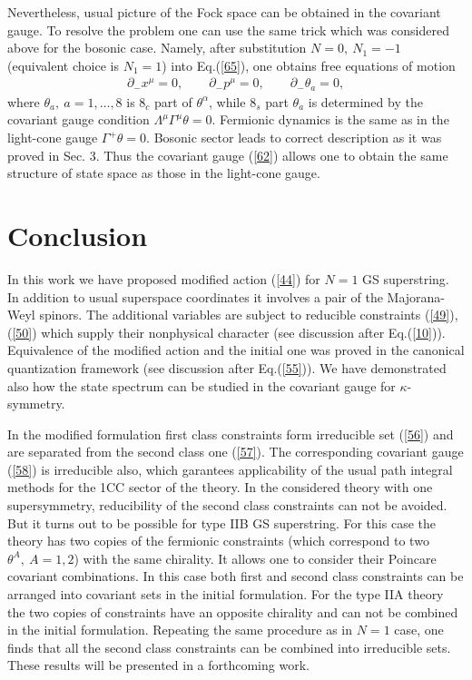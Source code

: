 \documentclass[a4paper]{article}
\begin{document}
Nevertheless, usual picture of the Fock space can be obtained in the 
covariant gauge. To resolve the problem one can use the same trick which 
was considered above for the bosonic case. Namely, after substitution 
$N=0, ~ N_1=-1$ (equivalent choice is $N_1=1$) into Eq.(\ref{65}), one 
obtains free equations of motion
\begin{eqnarray}\label{66}
\partial_-x^\mu=0, \qquad \partial_-p^\mu=0, \qquad
\partial_-\theta_a=0, 
\end{eqnarray}
where $\theta_a, ~ a=1, \ldots ,8$ is $8_c$ part of $\theta^\alpha$, 
while $8_s$ part $\theta_{\dot a}$ is determined by the covariant gauge 
condition $\Lambda^\mu\Gamma^\mu\theta=0$. Fermionic dynamics is the same 
as in the light-cone gauge $\Gamma^+\theta=0$. Bosonic sector leads to 
correct description as it was proved in Sec. 3. Thus the covariant 
gauge (\ref{62}) allows one to obtain the same structure of state space 
as those in the light-cone gauge.   

\section{Conclusion}

In this work we have proposed modified action (\ref{44}) for $N=1$ GS 
superstring. In addition to usual superspace coordinates it involves a 
pair of the Majorana-Weyl spinors. The additional variables are subject 
to reducible constraints (\ref{49}), (\ref{50}) which supply their 
nonphysical character (see discussion after Eq.(\ref{10})). Equivalence 
of the modified action and the initial one was proved in the canonical 
quantization framework (see discussion after Eq.(\ref{55})). We have 
demonstrated also how the state spectrum can be studied in the covariant 
gauge for $\kappa$-symmetry.

In the modified formulation first class constraints form irreducible set 
(\ref{56}) and are separated from the second class one (\ref{57}). The 
corresponding covariant gauge (\ref{58}) is irreducible also, which 
garantees applicability of the usual path integral methods for the 1CC 
sector of the theory. In the considered theory with one supersymmetry, 
reducibility of the second class constraints can not be avoided. But it 
turns out to be possible for type IIB GS superstring. For this case the  
theory has two copies of the fermionic constraints (which correspond 
to two $\theta^A, ~ A=1,2$) with the same chirality. It allows one to 
consider their Poincare covariant combinations. In this case both first 
and second class constraints can be arranged into covariant sets in the 
initial formulation. For the type IIA theory the two copies of 
constraints have an opposite chirality and can not be combined in the 
initial formulation. Repeating the same procedure as in $N=1$ case, one 
finds that all the second class constraints  
can be combined into irreducible sets.   
These results will be presented in a forthcoming work.
\end{document}
